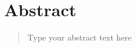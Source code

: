 
\chapter*{\centering Abstract}
\begin{quotation}
\noindent 

Type your abstract text here

\end{quotation}